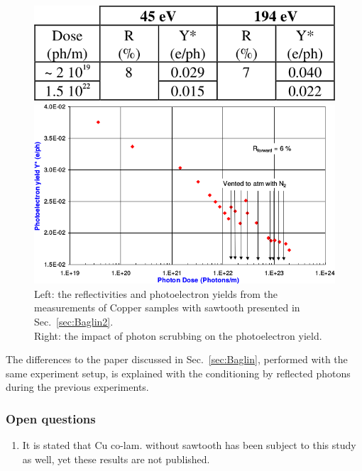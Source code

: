 \begin{figure}[tbh]
    \centering
    \begin{minipage}[c]{0.37\textwidth}
        \includegraphics[width=\textwidth]{../ss/experiment_baglin2.png}
    \end{minipage}
    \hspace{0.5cm}
    \begin{minipage}[c]{0.57\textwidth}
        \includegraphics[width=1\textwidth]{../ss/photoelectron_scrubbing_baglin2.png}
    \end{minipage}
    \caption{
        Left: the reflectivities and photoelectron yields from the measurements of Copper samples with sawtooth presented in Sec.~\ref{sec:Baglin2}.
        \\
        Right: the impact of photon scrubbing on the photoelectron yield.
    }
    \label{fig:baglin2_scrubbing}
\end{figure}


The differences to the paper discussed in Sec.~\ref{sec:Baglin}, performed with the same experiment setup, is explained with the conditioning by reflected photons during the previous experiments.

\subsubsection{Open questions}

\begin{enumerate}
    \item It is stated that Cu co-lam. without sawtooth has been subject to this study as well, yet these results are not published.
\end{enumerate}

